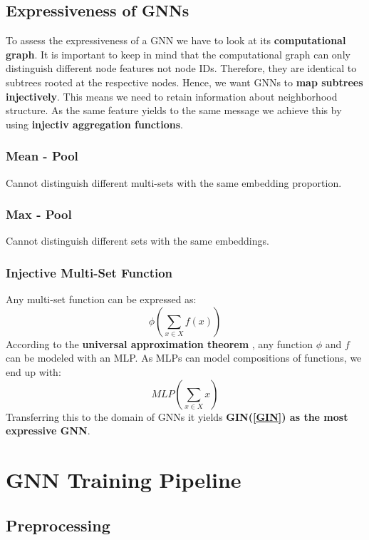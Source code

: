 \documentclass[parskip=full]{scrartcl}
\begin{document}
\subsection{Expressiveness of GNNs}
To assess the expressiveness of a GNN we have to look at its \textbf{computational graph}. It is important to keep in mind that the computational graph can only distinguish different node features not node IDs. Therefore, they are identical to subtrees rooted at the respective nodes.\newline
Hence, we want GNNs to \textbf{map subtrees injectively}. This means we need to retain information about neighborhood structure. As the same feature yields to the same message we achieve this by using \textbf{injectiv aggregation functions}.

\subsubsection{Mean - Pool}
Cannot distinguish different multi-sets with the same embedding proportion.

\subsubsection{Max - Pool}
Cannot distinguish different sets with the same embeddings.

\subsubsection{Injective Multi-Set Function}
Any multi-set function can be expressed as:
\[\phi\left(\sum_{x \in X} f(x)\right)\]
According to the \textbf{universal approximation theorem} \cite{HORNIK1989359}, any function $\phi$ and $f$ can be modeled with an MLP. As MLPs can model compositions of functions, we end up with:
\[MLP\left(\sum_{x \in X} x\right)\]
Transferring this to the domain of GNNs it yields \textbf{GIN(\ref{GIN}) as the most expressive GNN}.


\section{GNN Training Pipeline}

\subsection{Preprocessing}
\end{document}
